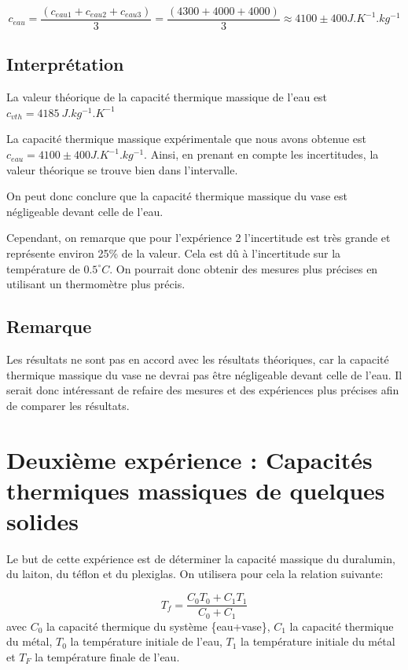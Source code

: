 \documentclass[12pt]{article}
\begin{document}
\begin{equation}
c_{eau} = \frac{\left(c_{eau1} + c_{eau2} + c_{eau3}\right)}{3} = \frac{\left(4300 + 4000 + 4000\right)}{3} \approx 4100 \pm 400 J.K^{-1}.kg^{-1}
\end{equation}

\subsection{Interprétation}

La valeur théorique de la capacité thermique massique de l'eau est $c_{vth }=4185 ~ J.kg^{-1}.K^{-1}$

La capacité thermique massique expérimentale que nous avons obtenue est $c_{eau} = 4100 \pm 400 J.K^{-1}.kg^{-1}$. Ainsi, en 
prenant en compte les incertitudes, la valeur théorique se trouve bien dans l'intervalle. 

On peut donc conclure que la capacité thermique massique du vase est négligeable devant celle de l'eau.

Cependant, on remarque que pour l'expérience 2 l'incertitude est très grande et représente environ 25\% de la valeur. Cela est dû
à l'incertitude sur la température de $0.5^\circ C$. On pourrait donc obtenir des mesures plus précises en utilisant un thermomètre
plus précis.

\subsection{Remarque}
Les résultats ne sont pas en accord avec les résultats théoriques, car la capacité thermique massique du vase ne devrai pas être négligeable
devant celle de l'eau. Il serait donc intéressant de refaire des mesures et des expériences plus précises afin de comparer les résultats.


\newpage
\section{Deuxième expérience : Capacités thermiques massiques de quelques solides}

Le but de cette expérience est de déterminer la capacité massique du duralumin, du laiton, du téflon et du plexiglas. On utilisera pour cela la relation suivante:

\begin{equation}
	T_f=\frac{C_0T_0+C_1T_1}{C_0+C_1}
\label{EquationTf}
\end{equation}
avec $C_0$ la capacité thermique du système \{eau+vase\}, $C_1$ la capacité thermique du métal, $T_0$ la température initiale de l'eau, $T_1$ la température initiale du métal et $T_F$ la température finale de l'eau.
\end{document}

